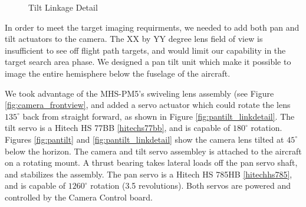 \documentclass[10pt]{report}
\newcommand{\degrees}[1]
{
\begin{math}
#1^{\circ} 
\end{math}
}
\begin{document}
\begin{figure}
	\caption{Tilt Linkage Detail}
	\label{fig:pantilt_link}
\end{figure}

In order to meet the target imaging requirments, we needed to add both pan and tilt actuators to the camera. The XX by YY degree lens field of view is insufficient to see off flight path targets, and would limit our capability in the target search area phase. 
We designed a pan tilt unit which make it possible to image the entire hemisphere below the fuselage of the aircraft.

We took advantage of the MHS-PM5's swiveling lens assembly 
(see Figure \ref{fig:camera_frontview}, and added a servo actuator which could rotate the lens \degrees{135} back from straight forward, as shown in Figure \ref{fig:pantilt_linkdetail}. The tilt servo is a Hitech HS 77BB \ref{hitechs77bb}, and is capable of \degrees{180} rotation. Figures \ref{fig:pantilt} and \ref{fig:pantilt_linkdetail} show the camera lens tilted at \degrees{45} below the horizon.
The camera and tilt servo assembley is attached to the aircraft on a rotating mount. A thrust bearing takes lateral loads off the pan servo shaft, and stabilizes the assembly. The pan servo is a Hitech HS 785HB \ref{hitechhs785}, and is capable of \degrees{1260} rotation (3.5 revolutions). Both servos are powered and controlled by the Camera Control board.
\end{document}
